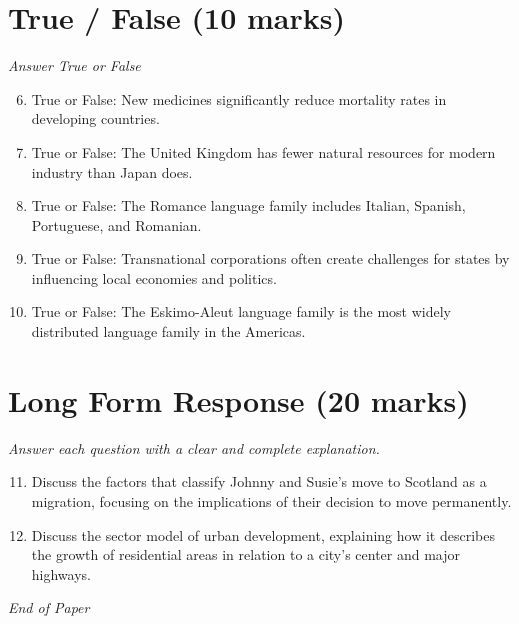 \documentclass[12pt]{article}
\begin{document}
\section*{True / False (10 marks)}
\textit{Answer True or False}
\begin{enumerate}[label=\arabic*.]
\setcounter{enumi}{5}
\item True or False: New medicines significantly reduce mortality rates in developing countries.
\item True or False: The United Kingdom has fewer natural resources for modern industry than Japan does.
\item True or False: The Romance language family includes Italian, Spanish, Portuguese, and Romanian.
\item True or False: Transnational corporations often create challenges for states by influencing local economies and politics.
\item True or False: The Eskimo-Aleut language family is the most widely distributed language family in the Americas.
\end{enumerate}

\section*{Long Form Response (20 marks)}
\textit{Answer each question with a clear and complete explanation.}
\begin{enumerate}[label=\arabic*.]
\setcounter{enumi}{10}
\item Discuss the factors that classify Johnny and Susie's move to Scotland as a migration, focusing on the implications of their decision to move permanently.
\item Discuss the sector model of urban development, explaining how it describes the growth of residential areas in relation to a city's center and major highways.
\end{enumerate}

\vfill
\noindent\textit{End of Paper}
\end{document}
